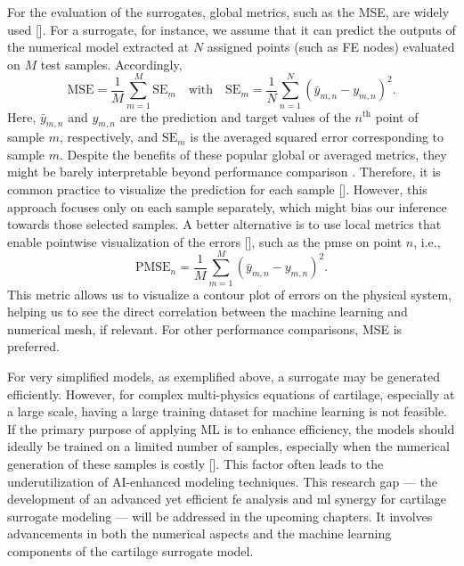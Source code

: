 \documentclass[12pt,a4paper]{report}
\begin{document}
For the evaluation of the surrogates, global metrics, such as the MSE, are widely used [\cite{phellan2021}]. For a surrogate, for instance, we assume that it can predict the outputs of the numerical model extracted at \( N \) assigned points (such as FE nodes) evaluated on \( M \) test samples. Accordingly,
%
\begin{equation}\label{eq:msem}
    \text{MSE} = \frac{1}{M}\sum_{m=1}^{M}\text{SE}_m
    \quad \text{with} \quad
    \text{SE}_m = \frac{1}{N}\sum_{n=1}^{N}
    (\bar{y}_{m,n} - y_{m,n})^2.
\end{equation}
%
Here, \( \bar{y}_{m,n} \) and \( y_{m,n} \) are the prediction and target values of the \( n^{\text{th}} \) point of sample \( m \), respectively, and \( \text{SE}_m \) is the averaged squared error corresponding to sample \( m \). Despite the benefits of these popular global or averaged metrics, they might be barely interpretable beyond performance comparison \cite{molnar2019}. Therefore, it is common practice to visualize the prediction for each sample [\cite{sanchez2020}]. However, this approach focuses only on each sample separately, which might bias our inference towards those selected samples. A better alternative is to use local metrics that enable pointwise visualization of the errors [\cite{giselle2019}], such as the \ac{pmse} on point \( n \), i.e.,
%
\begin{equation}\label{eq:pmse}
    \text{PMSE}_n = \frac{1}{M}\sum_{m=1}^{M}
    (\bar{y}_{m,n} - y_{m,n})^2.
\end{equation}
%
This metric allows us to visualize a contour plot of errors on the physical system, helping us to see the direct correlation between the machine learning and numerical mesh, if relevant. For other performance comparisons, MSE is preferred.

For very simplified models, as exemplified above, a surrogate may be generated efficiently. However, for complex multi-physics equations of cartilage, especially at a large scale, having a large training dataset for machine learning is not feasible. If the primary purpose of applying ML is to enhance efficiency, the models should ideally be trained on a limited number of samples, especially when the numerical generation of these samples is costly [\cite{forrester2008}]. This factor often leads to the underutilization of AI-enhanced modeling techniques. This research gap — the development of an advanced yet efficient \ac{fe} analysis and \ac{ml} synergy for cartilage surrogate modeling — will be addressed in the upcoming chapters. It involves advancements in both the numerical aspects and the machine learning components of the cartilage surrogate model.
\end{document}
